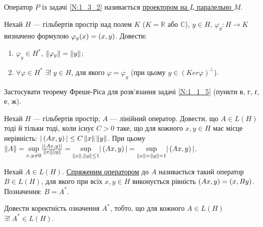 \begin{theory}
    Оператор $P$ із задачі \ref{N:1_3_2} називається \uline{проектором на $L$ паралельно $M$}.
\end{theory}

\begin{exercise}
    Нехай $H$ --- гільбертів простір над полем $K$ ($K=\mathbb{R}$ 
    або $\mathbb{C}$), $y \in H$, $\varphi_y : H \rightarrow K$ визначено 
    формулою $\varphi_y(x) = \left(x, y\right)$. Довести:
    \begin{enumerate}[label=\ukr*)]
        \item $\varphi_y \in H^*$, $\left\lVert\varphi_y\right\rVert = \left\lVert y\right\rVert$;
        \item $\forall \varphi \in H^*$ $\exists! \; y\in H$, для якого 
        $\varphi = \varphi_y$ (при цьому $y\in(Ker\varphi)^\bot$).
    \end{enumerate}
\end{exercise}

\begin{exercise}
    Застосувати теорему Фреше-Ріса для розв'язання задачі \ref{N:1_1_5}
    (пункти в, г, ґ, е, ж).
\end{exercise}

\begin{exercise}
    Нехай $H$ --- гільбертів простір; $A$ --- лінійний оператор. 
    Довести, що $A \in L(H)$ тоді й тільки тоді, коли існує 
    $C > 0$ таке, що для кожного $x, y \in H$ має місце нерівність:
    $|\left(Ax, y\right)| \leq C\left\lVert x\right\rVert\left\lVert y\right\rVert$. При цьому $\left\lVert A\right\rVert = 
    \underset{x,y \neq 0}{\sup} \frac{|\left(Ax, y\right)|}{\left\lVert x\right\rVert\left\lVert y\right\rVert}
    =\underset{\left\lVert x\right\rVert,\left\lVert y\right\rVert \leq 1}{\sup} |\left(Ax, y\right)| = 
    \underset{\left\lVert x\right\rVert = \left\lVert y\right\rVert = 1}{\sup} |\left(Ax, y\right)|$.
\end{exercise}

\begin{theory}
    Нехай $A \in L(H)$. \uline{Спряженим оператором} до $A$ називається 
    такий оператор $B \in L(H)$, для якого при всіх $x, y \in H$ 
    виконується рівність $\left(Ax, y\right) = \left(x, By\right)$. 
    Позначення: $B = A^*$. 
\end{theory}

\begin{exercise}
    Довести коректність означення $A^*$, тобто, що для кожного $A\in L(H)$ 
    $\exists! \; A^* \in L(H)$.
\end{exercise}

